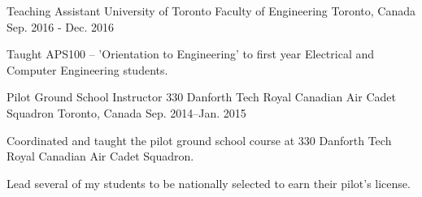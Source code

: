 

\begin{cventries}

  \cventry
    {Teaching Assistant} %
    {University of Toronto Faculty of Engineering} %
    {Toronto, Canada} %
    {Sep. 2016 - Dec. 2016} %
    {
      \begin{cvitems} %
        \item {Taught APS100 -- 'Orientation to Engineering' to first year Electrical and Computer Engineering students.}
      \end{cvitems}
    }

\cventry
    {Pilot Ground School Instructor} %
    {330 Danforth Tech Royal Canadian Air Cadet Squadron} %
    {Toronto, Canada} %
    {Sep. 2014--Jan. 2015} %
    {
      \begin{cvitems} %
        \item {Coordinated and taught the pilot ground school course at 330 Danforth Tech Royal Canadian Air Cadet Squadron.}
        \item {Lead several of my students to be nationally selected to earn their pilot's license.}
      \end{cvitems}
    }

\end{cventries}





